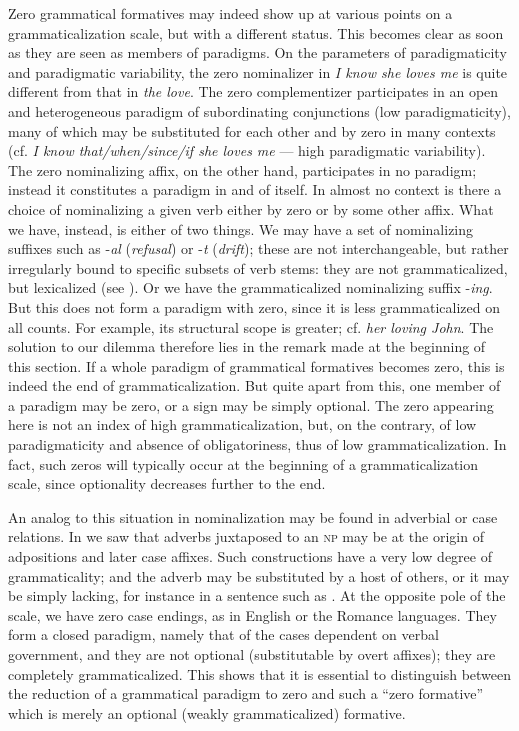 Zero grammatical formatives may indeed show up at various points on a grammaticalization scale, but with a different status. This becomes clear as soon as they are seen as members of paradigms. On the parameters of paradigmaticity and paradigmatic variability, the zero nominalizer in \textit{I know she loves me} is quite different from that in \textit{the love}. The zero complementizer participates in an open and heterogeneous paradigm of subordinating conjunctions (low paradigmaticity), many of which may be substituted for each other and by zero in many contexts (cf. \textit{I know that/when/since/if she loves me} — high paradigmatic variability). The zero nominalizing affix, on the other hand, participates in no paradigm; instead it constitutes a paradigm in and of itself. In almost no context is there a choice of nominalizing a given verb either by zero or by some other affix. What we have, instead, is either of two things. We may have a set of nominalizing suffixes such as -\textit{al} (\textit{refusal}) or -\textit{t} (\textit{drift}); these are not interchangeable, but rather irregularly bound to specific subsets of verb stems: they are not grammaticalized, but lexicalized (see ). Or we have the grammaticalized nominalizing suffix -\textit{ing}. But this does not form a paradigm with zero, since it is less grammaticalized on all counts. For example, its structural scope is greater; cf. \textit{her loving John}. The solution to our dilemma therefore lies in the remark made at the beginning of this section. If a whole paradigm of grammatical formatives becomes zero, this is indeed the end of grammaticalization. But quite apart from this, one member of a paradigm may be zero, or a sign may be simply optional. The zero appearing here is not an index of high grammaticalization, but, on the contrary, of low paradigmaticity and absence of obligatoriness, thus of low grammaticalization. In fact, such zeros will typically occur at the beginning of a grammaticalization scale, since optionality decreases further to the end.

An analog to this situation in nominalization may be found in adverbial or case relations. In  we saw that adverbs juxtaposed to an \textsc{np} may be at the origin of adpositions and later case affixes. Such constructions have a very low degree of grammaticality; and the adverb may be substituted by a host of others, or it may be simply lacking, for instance in a sentence such as . At the opposite pole of the scale, we have zero case endings, as in English or the Romance languages. They form a closed paradigm, namely that of the cases dependent on verbal government, and they are not optional (substitutable by overt affixes); they are completely grammaticalized. This shows that it is essential to distinguish between the reduction of a grammatical paradigm to zero and such a “zero formative” which is merely an optional (weakly grammaticalized) formative.

